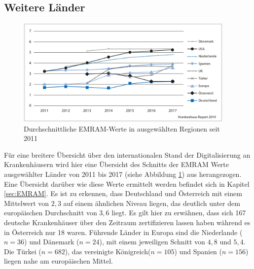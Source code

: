 \subsection{Weitere Länder}
\begin{figure}[ht]
	\includegraphics[width=0.95\textwidth]{Bilder/laendervergleich_EMRAM_Stephani_2019.png}
	\caption{Durchschnittliche EMRAM-Werte in ausgewählten Regionen seit 2011 \parencite{Stephani2019}}
	\label{fig:andere_laender}
\end{figure}
Für eine breitere Übersicht über den internationalen Stand der Digitalisierung an Krankenhäusern wird hier eine Übersicht des Schnitts der EMRAM Werte ausgewählter Länder von 2011 bis 2017 (siehe Abbildung \ref{fig:andere_laender}) aus \cite{Stephani2019} herangezogen. Eine Übersicht darüber wie diese Werte ermittelt werden befindet sich in Kapitel \ref{sec:EMRAM}. Es ist zu erkennen, dass Deutschland und Österreich mit einem Mittelwert von $2,3$ auf einem ähnlichen Niveau liegen, das deutlich unter dem europäischen Durchschnitt von $3,6$ liegt. Es gilt hier zu erwähnen, dass sich 167 deutsche Krankenhäuser über den Zeitraum zertifizieren lassen haben während es in Österreich nur 18 waren. Führende Länder in Europa sind die Niederlande ($n=36$) und Dänemark ($n=24$), mit einem jeweiligen Schnitt von $4,8$ und $5,4$. Die Türkei ($n=682$), das vereinigte Königreich($n=105$) und Spanien ($n=156$) liegen nahe am europäischen Mittel.

